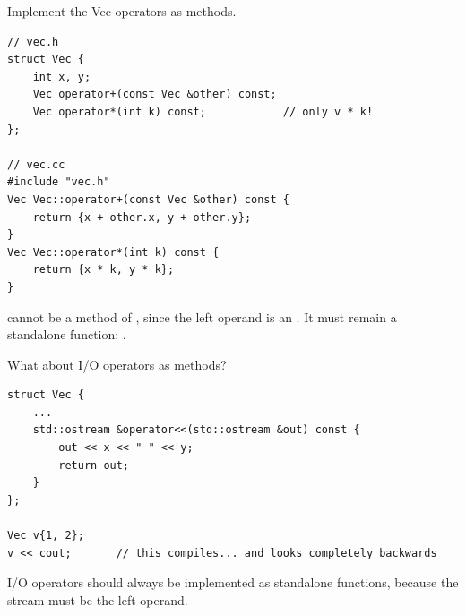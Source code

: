 \begin{example}
Implement the Vec operators as methods.
\begin{lstlisting}[style=cpp]
// vec.h
struct Vec {
    int x, y;
    Vec operator+(const Vec &other) const;
    Vec operator*(int k) const;            // only v * k!
};

// vec.cc
#include "vec.h"
Vec Vec::operator+(const Vec &other) const {
    return {x + other.x, y + other.y};
}
Vec Vec::operator*(int k) const {
    return {x * k, y * k};
}
\end{lstlisting}
 cannot be a method of , since the left operand is an
. It must remain a standalone function:
.
\end{example}

What about I/O operators as methods?
\begin{lstlisting}[style=cpp]
struct Vec {
    ...
    std::ostream &operator<<(std::ostream &out) const {
        out << x << " " << y;
        return out;
    }
};

Vec v{1, 2};
v << cout;       // this compiles... and looks completely backwards
\end{lstlisting}
\begin{important}[Rule]
I/O operators should always be implemented as standalone functions, because the
stream must be the left operand.
\end{important}

